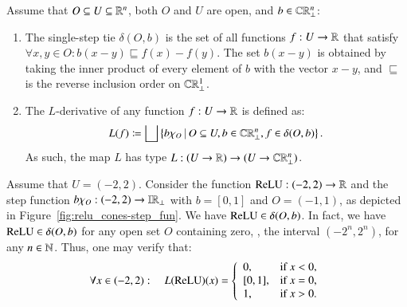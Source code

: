 \documentclass[11pt,times]{article}
\begin{document}
\begin{definition}
  \label{def:L_derivative}

  Assume that $O \subseteq U \subseteq \R^n$, both $O$ and $U$ are
  open, and $b \in \cCPPO{\R^n\lift}$:

  \begin{enumerate}[label=(\roman*)]

  \item The single-step tie $\delta(O, b)$ is the set of all functions
    $f : U \to \R$ that satisfy
    $\forall x, y \in O: b(x-y) \sqsubseteq f(x) - f(y)$. The set
    $b(x-y)$ is obtained by taking the inner product of every element
    of $b$ with the vector $x-y$, and $\sqsubseteq$ is the reverse
    inclusion order on $\cCPPO{\R^1\lift}$.

  \item \label{item:L_Derivative} The $L$-derivative of any function $f: U \to \R$ is defined
    as:    
    \begin{equation*}
     L(f) \defeq \bigsqcup \setbarTall{b \chi_O}{O \subseteq U, b \in
       \cCPPO{\R^n\lift}, f \in \delta(O, b)}. 
   \end{equation*}
   As such, the map $L$ has type $L: (U \to \R) \to (U \to \cCPPO{\R^n\lift})$.  
\end{enumerate}
  
\end{definition}


\begin{example}
  Assume that $U = (-2,2)$. Consider the function
  $\ReLU: (-2,2) \to \R$ and the step function
  $b \chi_O: (-2,2) \to \intvaldom[\R\lift]$ with $b = [0,1]$ and
  $O = (-1,1)$, as depicted in
  Figure~\ref{fig:relu_cones-step_fun}. We have
  $\ReLU \in \delta(O,b)$. In fact, we have $\ReLU \in \delta(O,b)$
  for any open set $O$ containing zero, {\eg}, the interval
  $(-2^n, 2^n)$, for any $n \in \N$. Thus, one may verify that:
  \begin{equation*}
    \forall x \in (-2,2): \quad  L(\ReLU)(x) =
    \left\{
      \begin{array}{ll}
        0, & \text{if } x < 0,\\
        {[0,1]}, & \text{if } x = 0,\\
        1, & \text{if } x > 0.
      \end{array}
    \right.    
  \end{equation*}
\end{example}
\end{document}
